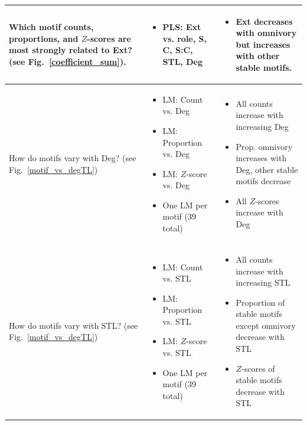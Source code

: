 \documentclass[12pt]{article}
\begin{document}
\begin{landscape}
\begin{table}[h!]
\begin{tabular}{m{6cm}|m{7.5cm}|m{8cm}}
        \hline
        Which motif counts, proportions, and $Z$-scores are most strongly related to Ext? (see Fig.~\ref{coefficient_sum}). & \begin{itemize}
            \item PLS: Ext vs. role, S, C, S:C, STL, Deg
        \end{itemize} & \begin{itemize}\item Ext decreases with omnivory but increases with other stable motifs. \end{itemize}\\
        \hline
        How do motifs vary with Deg? \newline(see Fig.~\ref{motif_vs_degTL}) & \begin{itemize} 
        \item LM: Count vs. Deg 
        \item LM: Proportion vs. Deg 
        \item LM: $Z$-score vs. Deg 
        \item One LM per motif (39 total)
        \end{itemize} 
        & 
        \begin{itemize}
            \item All counts increase with increasing Deg
            \item Prop. omnivory increases with Deg, other stable motifs decrease
            \item All $Z$-scores increase with Deg \end{itemize}\\
        How do motifs vary with STL? \newline(see Fig.~\ref{motif_vs_degTL}) & \begin{itemize} 
        \item LM: Count vs. STL 
        \item LM: Proportion vs. STL 
        \item LM: $Z$-score vs. STL
        \item One LM per motif (39 total)
        \end{itemize} &
        \begin{itemize}
            \item All counts increase with increasing STL
            \item Proportion of stable motifs except omnivory decrease with STL
            \item $Z$-scores of stable motifs decrease with STL
        \end{itemize} \\
        \end{tabular}
    \end{table}
\end{landscape}
\end{document}
